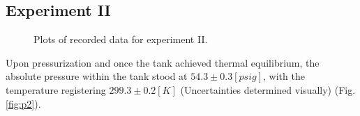 \documentclass[12pt]{article}
\begin{document}
\subsection*{Experiment II}
\begin{figure}[t!]
    \centering
    \hfill
    \caption{Plots of recorded data for experiment II.}
    \label{fig:graphs2}
\end{figure}
Upon pressurization and once the tank achieved thermal equilibrium, the absolute pressure within the tank stood at $54.3\pm0.3[psig]$, with the temperature registering $299.3\pm0.2[K]$ (Uncertainties determined visually) (Fig. \ref{fig:p2}). 
\end{document}
